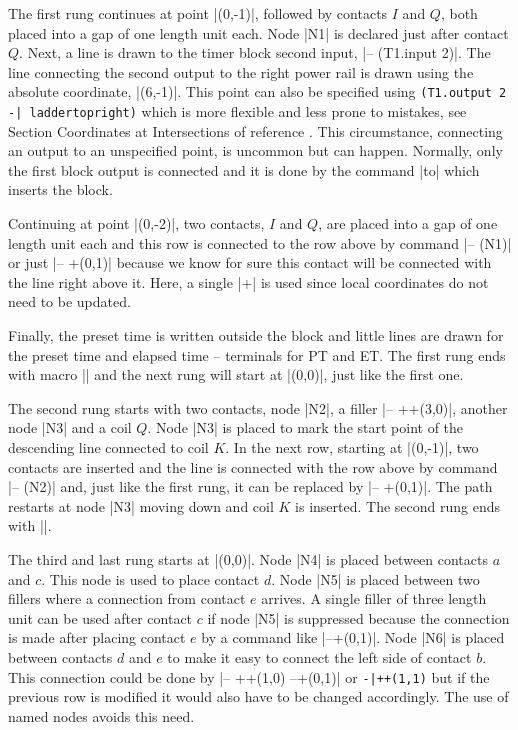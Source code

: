 \documentclass[a4paper]{ltxdoc}
\begin{document}
The first rung continues at point |(0,-1)|, followed by contacts $I$ and $Q$, both placed into a gap of one length unit each. Node |N1| is declared just after contact $Q$. Next, a line is drawn to the timer block second input, |-- (T1.input 2)|. The line connecting the second output to the right power rail is drawn using the absolute coordinate, |(6,-1)|. This point can also be specified using \verb!(T1.output 2 -| laddertopright)! which is more flexible and less prone to mistakes, see Section Coordinates at Intersections of reference \cite{Tantau}. This circumstance, connecting an output to an unspecified point, is uncommon but can happen. Normally, only the first block output is connected and it is done by the command |to| which inserts the block.

Continuing at point |(0,-2)|, two contacts, $I$ and $Q$, are placed into a gap of one length unit each and this row is connected to the row above by command |-- (N1)| or just |-- +(0,1)| because we know for sure this contact will be connected with the line right above it. Here, a single |+| is used since local coordinates do not need to be updated. 

Finally, the preset time is written outside the block and little lines are drawn for the preset time and elapsed time -- terminals for PT and ET. The first rung ends with macro || and the next rung will start at |(0,0)|, just like the first one.

The second rung starts with two contacts, node |N2|, a filler |-- ++(3,0)|, another node |N3| and a coil $Q$. Node |N3| is placed to mark the start point of the descending line connected to coil $K$. In the next row, starting at |(0,-1)|, two contacts are inserted and the line is connected with the row above by command |-- (N2)| and, just like the first rung, it can be replaced by |-- +(0,1)|. The path restarts at node |N3| moving down and coil $K$ is inserted. The second rung ends with ||.

The third and last rung starts at |(0,0)|. Node |N4| is placed between contacts $a$ and $c$. This node is used to place contact $d$. Node |N5| is placed between two fillers where a connection from contact $e$ arrives. A single filler of three length unit can be used after contact $c$ if node |N5| is suppressed because the connection is made after placing contact $e$ by a command like |--+(0,1)|. Node |N6| is placed between contacts $d$ and $e$ to make it easy to connect the left side of contact $b$. This connection could be done by |-- ++(1,0) --+(0,1)| or \verb!-|++(1,1)! but if the previous row is modified it would also have to be changed accordingly. The use of named nodes avoids this need.
\end{document}

